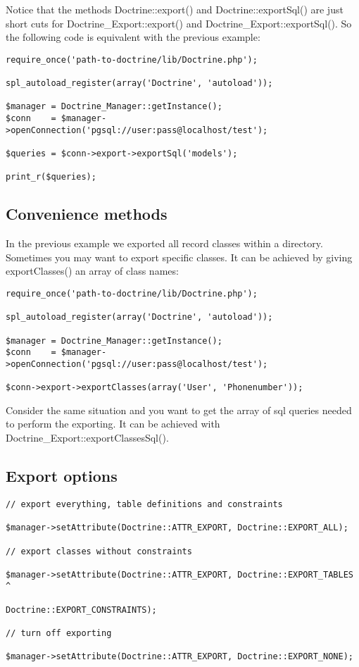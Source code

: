 \documentclass[11pt,a4paper]{report}
\begin{document}
Notice that the methods Doctrine::export() and Doctrine::exportSql() are just short cuts for Doctrine\_Export::export() and Doctrine\_Export::exportSql(). So the following code is equivalent with the previous example:

\begin{verbatim}
require_once('path-to-doctrine/lib/Doctrine.php');

spl_autoload_register(array('Doctrine', 'autoload'));

$manager = Doctrine_Manager::getInstance();
$conn    = $manager->openConnection('pgsql://user:pass@localhost/test');

$queries = $conn->export->exportSql('models');

print_r($queries);
\end{verbatim}

\subsection{Convenience methods}
In the previous example we exported all record classes within a directory. Sometimes you may want to export specific classes. It can be achieved by giving exportClasses() an array of class names:

\begin{verbatim}
require_once('path-to-doctrine/lib/Doctrine.php');

spl_autoload_register(array('Doctrine', 'autoload'));

$manager = Doctrine_Manager::getInstance();
$conn    = $manager->openConnection('pgsql://user:pass@localhost/test');

$conn->export->exportClasses(array('User', 'Phonenumber'));
\end{verbatim}

Consider the same situation and you want to get the array of sql queries needed to perform the exporting. It can be achieved with Doctrine\_Export::exportClassesSql().

\subsection{Export options}
\begin{verbatim}
// export everything, table definitions and constraints

$manager->setAttribute(Doctrine::ATTR_EXPORT, Doctrine::EXPORT_ALL);

// export classes without constraints

$manager->setAttribute(Doctrine::ATTR_EXPORT, Doctrine::EXPORT_TABLES ^
                                              Doctrine::EXPORT_CONSTRAINTS);

// turn off exporting

$manager->setAttribute(Doctrine::ATTR_EXPORT, Doctrine::EXPORT_NONE);
\end{verbatim}
\end{document}
